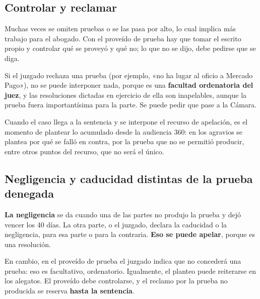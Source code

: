\documentclass[12pt,oneside]{book}
\begin{document}
\subsection{Controlar y reclamar}

Muchas veces se omiten pruebas o se las pasa por alto, lo cual implica más trabajo para el abogado. Con el proveído de prueba hay que tomar el escrito propio y controlar qué se proveyó y qué no; lo que no se dijo, debe pedirse que se diga.

Si el juzgado rechaza una prueba (por ejemplo, «no ha lugar al oficio a Mercado Pago»), no se puede interponer nada, porque es una \textbf{facultad ordenatoria del juez}, y las resoluciones dictadas en ejercicio de ella son inapelables, aunque la prueba fuera importantísima para la parte. Se puede pedir que pase a la Cámara.

Cuando el caso llega a la sentencia y se interpone el recurso de apelación, es el momento de plantear lo acumulado desde la audiencia 360: en los agravios se plantea por qué se falló en contra, por la prueba que no se permitió producir, entre otros puntos del recurso, que no será el único.

\subsection{Negligencia y caducidad distintas de la prueba denegada}

\textbf{La negligencia} se da cuando una de las partes no produjo la prueba y dejó vencer los 40 días. La otra parte, o el juzgado, declara la caducidad o la negligencia, para esa parte o para la contraria. \textbf{Eso se puede apelar}, porque es una resolución.

En cambio, en el proveído de prueba el juzgado indica que no concederá una prueba: eso es facultativo, ordenatorio. Igualmente, el planteo puede reiterarse en los alegatos. El proveído debe controlarse, y el reclamo por la prueba no producida se reserva \textbf{hasta la sentencia}.
\end{document}
